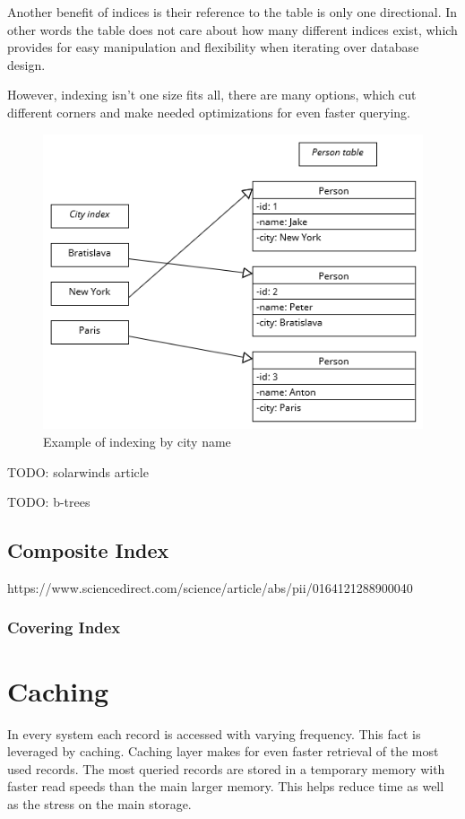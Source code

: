 \documentclass[10pt,a4paper]{article}
\begin{document}
Another benefit of indices is their reference to the table is only one directional. In other words the table does not care about how many different indices exist, which provides for easy manipulation and flexibility when iterating over database design.

However, indexing isn't one size fits all, there are many options, which cut different corners and make needed optimizations for even faster querying.
\cite{10.1007/978-3-319-93803-5_1}

\begin{figure}
    \centering
    \includegraphics[width=1\linewidth]{Indexing.png}
    \caption{Example of indexing by city name}
    \label{fig:index-city}
\end{figure}

TODO: solarwinds article

TODO: b-trees

\subsection{Composite Index}
https://www.sciencedirect.com/science/article/abs/pii/0164121288900040
\subsubsection{Covering Index}

\section{Caching}
In every system each record is accessed with varying frequency. This fact is leveraged by caching. Caching layer makes for even faster retrieval of the most used records. The most queried records are stored in a temporary memory with faster read speeds than the main larger memory. This helps reduce time as well as the stress on the main storage. \cite{10.1145/3009837.3009891}
\end{document}
